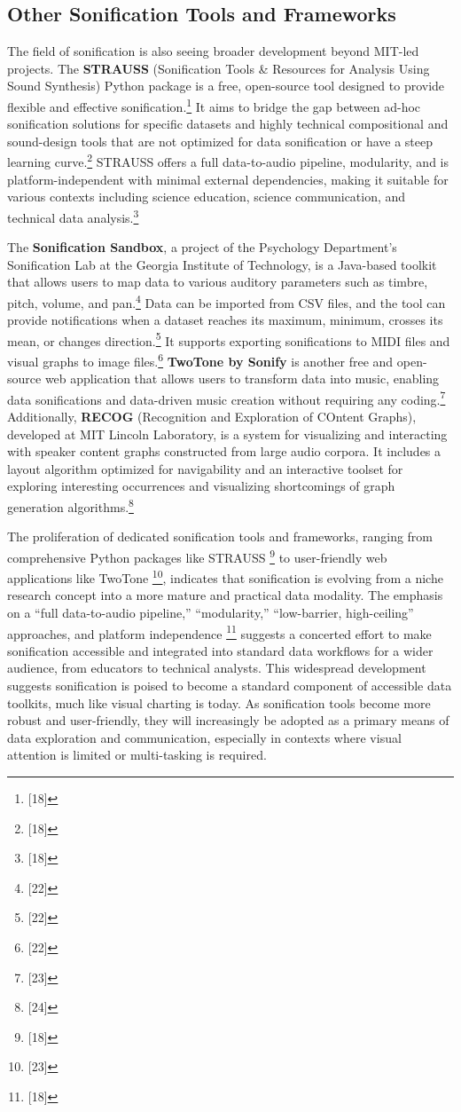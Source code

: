 \subsection{Other Sonification Tools and Frameworks}
The field of sonification is also seeing broader development beyond MIT-led projects. The \textbf{STRAUSS} (Sonification Tools \& Resources for Analysis Using Sound Synthesis) Python package is a free, open-source tool designed to provide flexible and effective sonification.\footnote{[18]} It aims to bridge the gap between ad-hoc sonification solutions for specific datasets and highly technical compositional and sound-design tools that are not optimized for data sonification or have a steep learning curve.\footnote{[18]} STRAUSS offers a full data-to-audio pipeline, modularity, and is platform-independent with minimal external dependencies, making it suitable for various contexts including science education, science communication, and technical data analysis.\footnote{[18]}

The \textbf{Sonification Sandbox}, a project of the Psychology Department's Sonification Lab at the Georgia Institute of Technology, is a Java-based toolkit that allows users to map data to various auditory parameters such as timbre, pitch, volume, and pan.\footnote{[22]} Data can be imported from CSV files, and the tool can provide notifications when a dataset reaches its maximum, minimum, crosses its mean, or changes direction.\footnote{[22]} It supports exporting sonifications to MIDI files and visual graphs to image files.\footnote{[22]} \textbf{TwoTone by Sonify} is another free and open-source web application that allows users to transform data into music, enabling data sonifications and data-driven music creation without requiring any coding.\footnote{[23]} Additionally, \textbf{RECOG} (Recognition and Exploration of COntent Graphs), developed at MIT Lincoln Laboratory, is a system for visualizing and interacting with speaker content graphs constructed from large audio corpora. It includes a layout algorithm optimized for navigability and an interactive toolset for exploring interesting occurrences and visualizing shortcomings of graph generation algorithms.\footnote{[24]}

The proliferation of dedicated sonification tools and frameworks, ranging from comprehensive Python packages like STRAUSS \footnote{[18]} to user-friendly web applications like TwoTone \footnote{[23]}, indicates that sonification is evolving from a niche research concept into a more mature and practical data modality. The emphasis on a ``full data-to-audio pipeline,'' ``modularity,'' ``low-barrier, high-ceiling'' approaches, and platform independence \footnote{[18]} suggests a concerted effort to make sonification accessible and integrated into standard data workflows for a wider audience, from educators to technical analysts. This widespread development suggests sonification is poised to become a standard component of accessible data toolkits, much like visual charting is today. As sonification tools become more robust and user-friendly, they will increasingly be adopted as a primary means of data exploration and communication, especially in contexts where visual attention is limited or multi-tasking is required.

